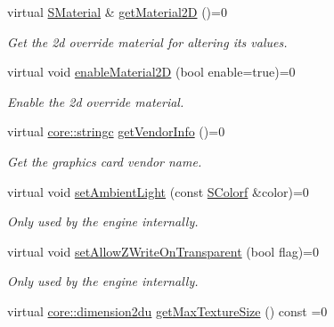 \begin{DoxyCompactItemize}
virtual \hyperlink{classirr_1_1video_1_1SMaterial}{S\+Material} \& \hyperlink{classirr_1_1video_1_1IVideoDriver_a198bbe60fdb1b5d6d0f4921e8a26109c}{get\+Material2D} ()=0
\begin{DoxyCompactList}\small\item\em Get the 2d override material for altering its values. \end{DoxyCompactList}\item 
virtual void \hyperlink{classirr_1_1video_1_1IVideoDriver_a7686a41fe0f506bb04c262f724f65756}{enable\+Material2D} (bool enable=true)=0
\begin{DoxyCompactList}\small\item\em Enable the 2d override material. \end{DoxyCompactList}\item 
\mbox{\label{classirr_1_1video_1_1IVideoDriver_a221a3ee79676ad9fbebc39cf0150516e}} 
virtual \hyperlink{namespaceirr_1_1core_ade1071a878633f2f6d8a75c5d11fec19}{core\+::stringc} \hyperlink{classirr_1_1video_1_1IVideoDriver_a221a3ee79676ad9fbebc39cf0150516e}{get\+Vendor\+Info} ()=0
\begin{DoxyCompactList}\small\item\em Get the graphics card vendor name. \end{DoxyCompactList}\item 
virtual void \hyperlink{classirr_1_1video_1_1IVideoDriver_aaba8d96a8061264393fc74ac9a3cd04f}{set\+Ambient\+Light} (const \hyperlink{classirr_1_1video_1_1SColorf}{S\+Colorf} \&color)=0
\begin{DoxyCompactList}\small\item\em Only used by the engine internally. \end{DoxyCompactList}\item 
virtual void \hyperlink{classirr_1_1video_1_1IVideoDriver_af78022589e5b7cb42b4d6ed2f7950e42}{set\+Allow\+Z\+Write\+On\+Transparent} (bool flag)=0
\begin{DoxyCompactList}\small\item\em Only used by the engine internally. \end{DoxyCompactList}\item 
\mbox{\label{classirr_1_1video_1_1IVideoDriver_a9bc9632861757d167c035bb5ecfa6854}} 
virtual \hyperlink{namespaceirr_1_1core_ad2e562e3219072e2f7fc7c2bba0ef0cb}{core\+::dimension2du} \hyperlink{classirr_1_1video_1_1IVideoDriver_a9bc9632861757d167c035bb5ecfa6854}{get\+Max\+Texture\+Size} () const =0

\end{DoxyCompactItemize}
